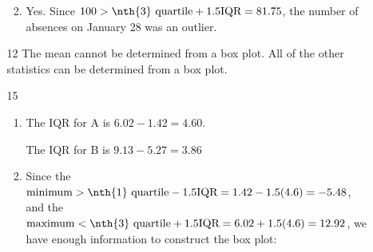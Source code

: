\documentclass[12pt,letterpaper]{article}
\begin{document}
\begin{enumerate}
\begin{enumerate}
\begin{enumerate}[label=(\arabic*)]
            \item

              Yes. Since $100 > \text{\nth{3} quartile} + 1.5\text{IQR} = 81.75$,
              the number of absences on January 28 was an outlier.
          \end{enumerate}
        \item [12]
          The mean cannot be determined from a box plot.
          All of the other statistics can be determined from a box plot.
        \item [15]
          \begin{enumerate}[label=(\arabic*)]
            \item
              The IQR for A is $6.02 - 1.42 = 4.60$.

              The IQR for B is $9.13 - 5.27 = 3.86$
            \item
              Since the $\text{minimum} > \text{\nth{1} quartile} - 1.5 \text{IQR} = 1.42 - 1.5(4.6) = -5.48$,
              and the $\text{maximum} < \text{\nth{3} quartile} + 1.5 \text{IQR} = 6.02 + 1.5(4.6) = 12.92$,
              we have enough information to construct the box plot:


\end{enumerate}
\end{enumerate}
\end{enumerate}
\end{document}
